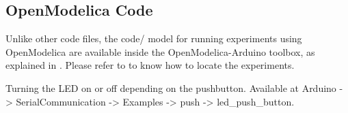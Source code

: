 

\subsection{OpenModelica Code}
Unlike other code files, the code/ model for running experiments using OpenModelica are 
available inside the OpenModelica-Arduino toolbox, as explained in .
Please refer to  to know how to locate the experiments. 
\label{sec:push-OpenModelica-code}

\begin{OpenModelicacode}
\label{OpenModelica:push-100}

\end{OpenModelicacode}

\begin{OpenModelicacode}
  {Turning the LED on or off depending on the pushbutton.  Available at Arduino -> SerialCommunication -> 
  Examples -> push -> led\_push\_button.}
\label{OpenModelica:push-200}

\end{OpenModelicacode}
